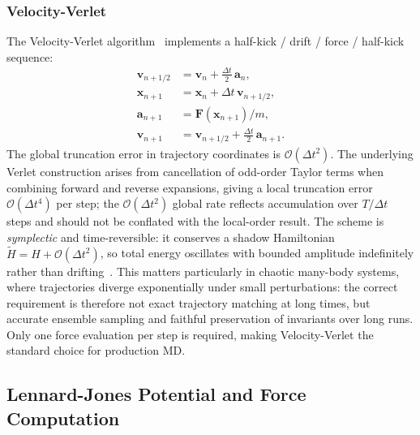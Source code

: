 \documentclass[10pt,twocolumn]{article}
\begin{document}
\subsubsection{Velocity-Verlet}

The Velocity-Verlet algorithm~\citep{Verlet1967,Swope1982} implements a
half-kick / drift / force / half-kick sequence:
\begin{align}
  \mathbf{v}_{n+1/2} &= \mathbf{v}_n + \tfrac{\Delta t}{2}\,\mathbf{a}_n,
    \label{eq:vv1}\\
  \mathbf{x}_{n+1} &= \mathbf{x}_n + \Delta t\,\mathbf{v}_{n+1/2},
    \label{eq:vv2}\\
  \mathbf{a}_{n+1} &= \mathbf{F}(\mathbf{x}_{n+1})/m, \label{eq:vv3}\\
  \mathbf{v}_{n+1} &= \mathbf{v}_{n+1/2} + \tfrac{\Delta t}{2}\,\mathbf{a}_{n+1}.
    \label{eq:vv4}
\end{align}
The global truncation error in trajectory coordinates is
$\mathcal{O}(\Delta t^2)$.
The underlying Verlet construction arises from cancellation of odd-order
Taylor terms when combining forward and reverse expansions, giving a local
truncation error $\mathcal{O}(\Delta t^4)$ per step; the
$\mathcal{O}(\Delta t^2)$ global rate reflects accumulation over
$T/\Delta t$ steps and should not be conflated with the local-order result.
The scheme is \emph{symplectic} and time-reversible: it conserves a shadow
Hamiltonian $\tilde{H}=H+\mathcal{O}(\Delta t^2)$, so total energy oscillates
with bounded amplitude indefinitely rather than drifting~\citep{Hairer2006}.
This matters particularly in chaotic many-body systems, where trajectories
diverge exponentially under small perturbations: the correct requirement is
therefore not exact trajectory matching at long times, but accurate ensemble
sampling and faithful preservation of invariants over long runs.
Only one force evaluation per step is required, making Velocity-Verlet the
standard choice for production MD.

\subsection{Lennard-Jones Potential and Force Computation}
\label{sec:lj}
\end{document}
